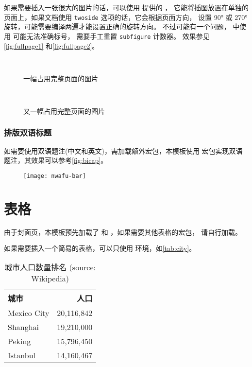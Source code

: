 如果需要插入一张很大的图片的话，可以使用  提供的 ，
它能将插图放置在单独的页面上，如果文档使用 \verb|twoside| 选项的话，它会根据页面方向，
设置 \ang{90} 或 \ang{270} 旋转，可能需要编译两遍才能设置正确的旋转方向。
不过可能有一个问题， 中使用  可能无法准确标号，
需要手工重置 \texttt{subfigure} 计数器。
效果参见\autoref{fig:fullpage1} 和\autoref{fig:fullpage2}。

\setcounter{subfigure}{0}
\begin{sidewaysfigure}
   \\
  \caption{一幅占用完整页面的图片}
  \label{fig:fullpage1}
\end{sidewaysfigure}

\setcounter{subfigure}{0}
\begin{sidewaysfigure}
   \\
  \caption{又一幅占用完整页面的图片}
  \label{fig:fullpage2}
\end{sidewaysfigure}

\subsubsection{排版双语标题}

如需要使用双语题注(中文和英文)，需加载额外宏包，本模板使用
宏包实现双语题注，其效果可以参考\autoref{fig:bicap}。

\begin{figure}[htb]
  \texttt{[image: nwafu-bar]}
  \label{fig:bicap}
\end{figure}


\section{表格}

由于封面页，本模板预先加载了  和 ，如果需要其他表格的宏包，
请自行加载。

如果需要插入一个简易的表格，可以只使用  环境，如\autoref{tab:city}。
\begin{table}[htb]
  \caption[城市人口]{城市人口数量排名 (source: Wikipedia)\label{tab:city}}
  \begin{tabular}{lr}
    \toprule
    城市 & 人口 \\
    \midrule
    Mexico City & 20,116,842\\
    Shanghai & 19,210,000\\
    Peking & 15,796,450\\
    Istanbul & 14,160,467\\
    \bottomrule
  \end{tabular}
\end{table}

